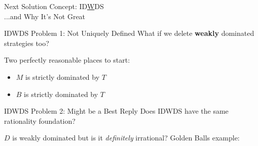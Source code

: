 \begin{frame}[standout]
    Next Solution Concept: ID\uline{W}DS\\
    ...and Why It's Not Great
\end{frame}

\begin{frame}{IDWDS Problem 1: Not Uniquely Defined}
What if we delete \textbf{weakly} dominated strategies too?
\bsk
\centering
\begin{matrixgame}[top={L, R}, left={A, T, M, B}, player names={Player 1, Player 2}]
\end{matrixgame}
\bsk
\raggedright
Two perfectly reasonable places to start:
\begin{itemize}
    \item $M$ is strictly dominated by $T$ \ \ \ \ \ 
    \item $B$ is strictly dominated by $T$ \ \ \ \ \ 
\end{itemize}
\end{frame}

\begin{frame}{IDWDS Problem 2: Might be a Best Reply}
    Does IDWDS have the same rationality foundation?
    \begin{center}
    \centering
        \begin{matrixgame}[top={L,R},left={U,D}]
    \end{matrixgame}
    \end{center}
    $D$ is weakly dominated but is it \textit{definitely} irrational?
    \bsk
    Golden Balls example:
    \begin{center}
        \begin{matrixgame}[top={C,D},left={C,D},player names={Sarah,Steven}]
        \end{matrixgame}
    \end{center}
\end{frame}



